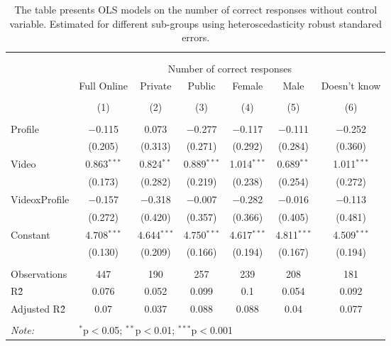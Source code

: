 
\begin{table}[H] \centering 
  \caption{The table presents OLS models on the number of correct responses without control variable. Estimated for different sub-groups using 
            heteroscedasticity robust standared errors.} 
  \label{tbl:Main_results_CR_no_control} 
\begin{tabular}{@{\extracolsep{5pt}}lcccccc} 
\\[-1.8ex]\hline 
\hline \\[-1.8ex] 
\\[-1.8ex] & \multicolumn{6}{c}{Number of correct responses} \\ 
 & Full Online & Private & Public & Female & Male & Doesn't know \\ 
\\[-1.8ex] & (1) & (2) & (3) & (4) & (5) & (6)\\ 
\hline \\[-1.8ex] 
 Profile & $-$0.115 & 0.073 & $-$0.277 & $-$0.117 & $-$0.111 & $-$0.252 \\ 
  & (0.205) & (0.313) & (0.271) & (0.292) & (0.284) & (0.360) \\ 
  Video & 0.863$^{***}$ & 0.824$^{**}$ & 0.889$^{***}$ & 1.014$^{***}$ & 0.689$^{**}$ & 1.011$^{***}$ \\ 
  & (0.173) & (0.282) & (0.219) & (0.238) & (0.254) & (0.272) \\ 
  VideoxProfile & $-$0.157 & $-$0.318 & $-$0.007 & $-$0.282 & $-$0.016 & $-$0.113 \\ 
  & (0.272) & (0.420) & (0.357) & (0.366) & (0.405) & (0.481) \\ 
  Constant & 4.708$^{***}$ & 4.644$^{***}$ & 4.750$^{***}$ & 4.617$^{***}$ & 4.811$^{***}$ & 4.509$^{***}$ \\ 
  & (0.130) & (0.209) & (0.166) & (0.194) & (0.167) & (0.194) \\ 
 \hline \\[-1.8ex] 
Observations & 447 & 190 & 257 & 239 & 208 & 181 \\ 
R\^2 & 0.076 & 0.052 & 0.099 & 0.1 & 0.054 & 0.092 \\ 
Adjusted R\^2 & 0.07 & 0.037 & 0.088 & 0.088 & 0.04 & 0.077 \\ 
\hline 
\hline \\[-1.8ex] 
\textit{Note:}  & \multicolumn{6}{l}{$^{*}$p$<$0.05; $^{**}$p$<$0.01; $^{***}$p$<$0.001} \\ 
\end{tabular} 
\end{table} 
